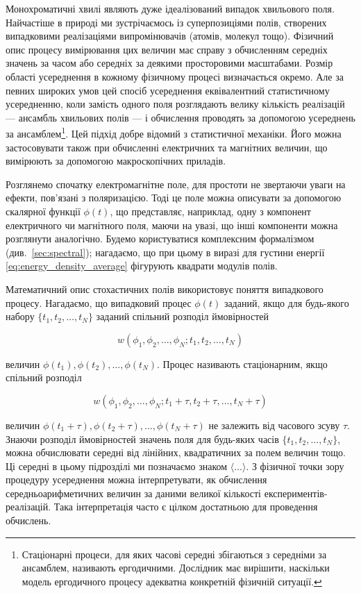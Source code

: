 Монохроматичні хвилі являють дуже ідеалізований випадок хвильового поля. Найчастіше в природі ми зустрічаємось із суперпозиціями полів, створених
випадковими реалізаціями випромінювачів (атомів, молекул тощо). Фізичний опис процесу вимірювання цих величин має справу з обчисленням середніх значень
за часом або середніх за деякими просторовими масштабами. Розмір області усереднення в кожному фізичному процесі визначається окремо. Але за певних
широких умов цей спосіб усереднення еквівалентний статистичному усередненню, коли замість одного поля розглядають велику кількість реалізацій ---
ансамбль хвильових полів --- і обчислення проводять за допомогою усереднень за ансамблем\footnote{Стаціонарні процеси, для яких часові середні
збігаються з середніми за ансамблем, називають ергодичними. Дослідник має вирішити, наскільки модель ергодичного процесу адекватна конкретній фізичній
ситуації.}. Цей підхід добре відомий з статистичної механіки. Його можна застосовувати також при обчисленні електричних та магнітних величин, що
вимірюють за допомогою макроскопічних приладів.

Розглянемо спочатку електромагнітне поле, для простоти не звертаючи уваги на ефекти, пов’язані з поляризацією. Тоді це поле можна описувати за допомогою
скалярної функції \(\phi(t)\), що представляє, наприклад, одну з компонент електричного чи магнітного поля, маючи на увазі, що інші компоненти можна
розглянути аналогічно. Будемо користуватися комплексним формалізмом (див.~\ref{sec:spectral}); нагадаємо, що при цьому в виразі для густини енергії
\eqref{eq:energy_density_average} фігурують квадрати модулів полів.

Математичний опис стохастичних полів використовує поняття випадкового процесу. Нагадаємо, що випадковий процес \(\phi(t)\) заданий, якщо для будь-якого
набору \(\{t_1, t_2, \dots, t_N\}\) заданий спільний розподіл ймовірностей

\begin{equation*}
w(\phi_1, \phi_2, \dots, \phi_N; t_1, t_2, \dots, t_N)
\end{equation*}

величин \(\phi(t_1), \phi(t_2), \dots, \phi(t_N)\). Процес називають стаціонарним, якщо спільний розподіл

\begin{equation*}
w(\phi_1, \phi_2, \dots, \phi_N; t_1 + \tau, t_2 + \tau, \dots, t_N + \tau)
\end{equation*}

величин \(\phi(t_1 + \tau), \phi(t_2 + \tau), \dots, \phi(t_N + \tau)\) не залежить від часового зсуву \(\tau\). Знаючи розподіл ймовірностей значень
поля для будь-яких часів \(\{t_1, t_2, \dots, t_N\}\), можна обчислювати середні від лінійних, квадратичних за полем величин тощо. Ці середні в цьому
підрозділі ми позначаємо знаком \(\langle \dots \rangle\). З фізичної точки зору процедуру усереднення можна інтерпретувати, як обчислення
середньоарифметичних величин за даними великої кількості експериментів-реалізацій. Така інтерпретація часто є цілком достатньою для проведення обчислень.

